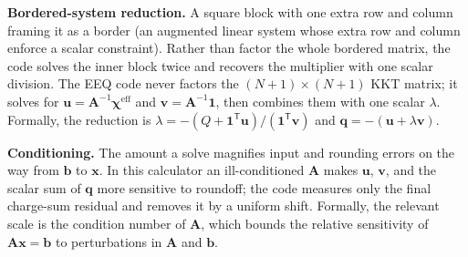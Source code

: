 \documentclass[11pt]{article}
\begin{document}
\textbf{Bordered-system reduction.} A square block with one extra row and column
framing it as a border (an augmented linear system whose extra row and column
enforce a scalar constraint). Rather than factor the whole
bordered matrix, the code solves the inner block twice and recovers the
multiplier with one scalar division. The EEQ code never factors the
\((N+1)\times(N+1)\) KKT matrix; it solves for
\(\bm u=\bm A^{-1}\bm\chi^{\mathrm{eff}}\) and
\(\bm v=\bm A^{-1}\bm1\), then combines them with one scalar \(\lambda\).
Formally, the reduction is
\(\lambda=-(Q+\bm1^{\mathsf T}\bm u)/(\bm1^{\mathsf T}\bm v)\) and
\(\bm q=-(\bm u+\lambda\bm v)\).

\textbf{Conditioning.} The amount a solve magnifies input and rounding errors
on the way from \(\bm b\) to \(\bm x\). In this calculator an ill-conditioned \(\bm A\) makes
\(\bm u\), \(\bm v\), and the scalar sum of \(\bm q\) more sensitive to
roundoff; the code measures only the final charge-sum residual and removes it
by a uniform shift. Formally, the relevant scale is the condition number of
\(\bm A\), which bounds the relative sensitivity of
\(\bm A\bm x=\bm b\) to perturbations in \(\bm A\) and \(\bm b\).
\end{document}
